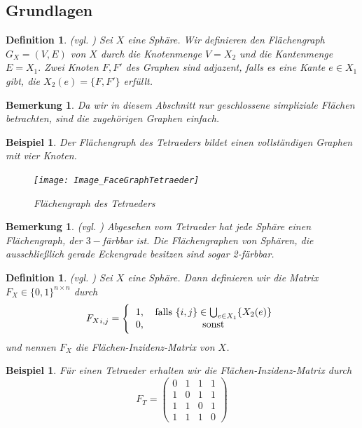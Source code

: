 \documentclass[12pt,titlepage,twoside,cleardoublepage]{article}
\theoremstyle{nummermitklammern}
\newtheorem{bsp}[temp]{Beispiel}
\newtheorem{definition}[temp]{Definition}
\newtheorem{bemerkung}[temp]{Bemerkung}
\newtheorem{definition}[zahl]{Definition}
\newtheorem{bsp}[zahl]{Beispiel}
\newtheorem{bemerkung}[zahl]{Bemerkung}
\numberwithin{equation}{section}
\begin{document}
\subsection{Grundlagen}
\begin{definition}{\textsc{(}vgl. \textsc{\cite{simp})}}
Sei $X$ eine Sphäre. Wir definieren den Flächengraph $G_X=(V,E)$ von $X$ durch die Knotenmenge $V=X_2$ und die Kantenmenge $E=X_1.$ Zwei Knoten $F,F'$ des Graphen sind adjazent, falls es eine Kante $e\in X_1$ gibt, die $X_2(e)=\{F,F'\}$ erfüllt. 
\end{definition}
\begin{bemerkung}
Da wir in diesem Abschnitt nur geschlossene simpliziale Flächen betrachten, sind die zugehörigen Graphen einfach. 
\end{bemerkung}
\begin{bsp}
Der Flächengraph des Tetraeders bildet einen vollständigen Graphen mit vier Knoten.
\begin{figure}[H]
\begin{center}
\texttt{[image: Image\_FaceGraphTetraeder]}
\end{center}
\caption{Flächengraph des Tetraeders}
\end{figure}
\end{bsp}
\begin{bemerkung}{\textsc{(}vgl. \textsc{\cite{simp})}}
Abgesehen vom Tetraeder hat jede Sphäre einen  Flächengraph, der $3-$färbbar ist. Die Flächengraphen von Sphären, die ausschließlich gerade Eckengrade besitzen sind sogar 2-färbbar.
\end{bemerkung}
\begin{definition}{\textsc{(}vgl. \textsc{\cite{simp})}}
Sei $X$ eine Sphäre. Dann definieren wir die Matrix 
$F_X\in \{0,1\}^{n \times n}$ durch
\[
{F_X}_{i,j}=
\Biggl\{
\begin{tabular}[l]{lcr}
1,&\textcolor{black}{falls $\{i,j\}\in \bigcup_{e\in X_1} \{X_2(e)\}$} \\
0,& sonst\\
\end{tabular}
\] und nennen $F_X$ die Flächen-Inzidenz-Matrix von $X$. 
\end{definition}
\begin{bsp}
Für einen Tetraeder erhalten wir die Flächen-Inzidenz-Matrix  durch  
\[
F_T=
\left( \begin{array}{rrrrrrrr}
0 & 1 & 1 & 1 \\ 
1 & 0 & 1 & 1 \\
1 & 1 & 0 & 1 \\
1 & 1 & 1 & 0  
\end{array}
\right)
\]

\end{bsp}
\end{document}
